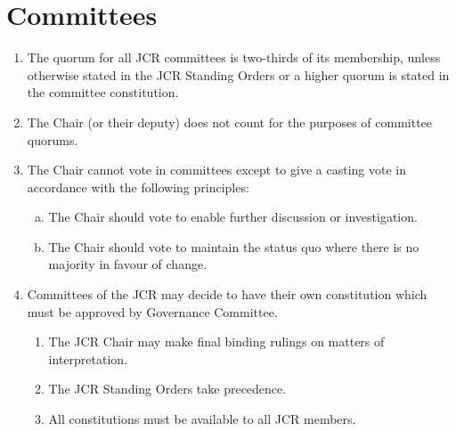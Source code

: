 \documentclass[12pt]{article}
\begin{document}
\section{Committees}
\begin{enumerate}
    \item The quorum for all JCR committees is two-thirds of its membership, unless otherwise stated in the JCR Standing Orders or a higher quorum is stated in the committee constitution.
    \item The Chair (or their deputy) does not count for the purposes of committee quorums.
    \item \label{Chair Vote} The Chair cannot vote in committees except to give a casting vote in accordance with the following principles:
    \begin{enumerate}[(a)]
        \item The Chair should vote to enable further discussion or investigation.
        \item The Chair should vote to maintain the status quo where there is no majority in favour of change.
    \end{enumerate}
    \item Committees of the JCR may decide to have their own constitution which must be approved by Governance Committee.
    \begin{enumerate}
        \item The JCR Chair may make final binding rulings on matters of interpretation.
        \item The JCR Standing Orders take precedence.
        \item All constitutions must be available to all JCR members.
    \end{enumerate}

\end{enumerate}
\end{document}
